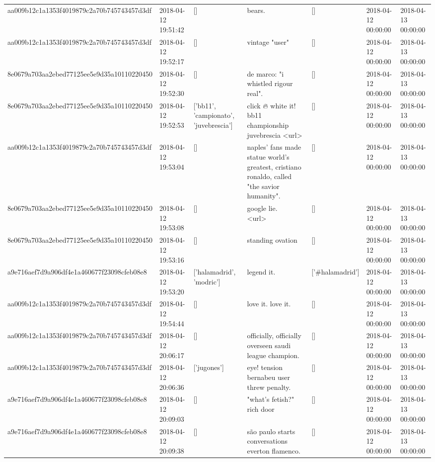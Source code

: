\begin{tabular}{lllllll}
aa009b12c1a1353f4019879c2a70b745743457d3df & 2018-04-12 19:51:42 & [] & bears. & [] & 2018-04-12 00:00:00 & 2018-04-13 00:00:00 \\
aa009b12c1a1353f4019879c2a70b745743457d3df & 2018-04-12 19:52:17 & [] & vintage "user" & [] & 2018-04-12 00:00:00 & 2018-04-13 00:00:00 \\
8e0679a703aa2ebed77125ee5e9d35a10110220450 & 2018-04-12 19:52:30 & [] & de marco: "i whistled rigour real". & [] & 2018-04-12 00:00:00 & 2018-04-13 00:00:00 \\
8e0679a703aa2ebed77125ee5e9d35a10110220450 & 2018-04-12 19:52:53 & ['bb11', 'campionato', 'juvebrescia'] & click 🔥 white it! bb11 championship juvebrescia <url> & [] & 2018-04-12 00:00:00 & 2018-04-13 00:00:00 \\
aa009b12c1a1353f4019879c2a70b745743457d3df & 2018-04-12 19:53:04 & [] & naples' fans made statue world's greatest, cristiano ronaldo, called "the savior humanity". & [] & 2018-04-12 00:00:00 & 2018-04-13 00:00:00 \\
8e0679a703aa2ebed77125ee5e9d35a10110220450 & 2018-04-12 19:53:08 & [] & google lie. 🔴🔴🔴 <url> & [] & 2018-04-12 00:00:00 & 2018-04-13 00:00:00 \\
8e0679a703aa2ebed77125ee5e9d35a10110220450 & 2018-04-12 19:53:16 & [] & standing ovation 👏👏👏👏👏👏 & [] & 2018-04-12 00:00:00 & 2018-04-13 00:00:00 \\
a9e716aef7d9a906df4e1a460677f23098cfeb08e8 & 2018-04-12 19:53:20 & ['halamadrid', 'modric'] & legend it. & ['#halamadrid'] & 2018-04-12 00:00:00 & 2018-04-13 00:00:00 \\
aa009b12c1a1353f4019879c2a70b745743457d3df & 2018-04-12 19:54:44 & [] & love it. love it. & [] & 2018-04-12 00:00:00 & 2018-04-13 00:00:00 \\
aa009b12c1a1353f4019879c2a70b745743457d3df & 2018-04-12 20:06:17 & [] & officially, officially overseen saudi league champion. & [] & 2018-04-12 00:00:00 & 2018-04-13 00:00:00 \\
aa009b12c1a1353f4019879c2a70b745743457d3df & 2018-04-12 20:06:36 & ['jugones'] & eye! tension bernabeu user threw penalty. & [] & 2018-04-12 00:00:00 & 2018-04-13 00:00:00 \\
a9e716aef7d9a906df4e1a460677f23098cfeb08e8 & 2018-04-12 20:09:03 & [] & "what's fetish?" rich door & [] & 2018-04-12 00:00:00 & 2018-04-13 00:00:00 \\
a9e716aef7d9a906df4e1a460677f23098cfeb08e8 & 2018-04-12 20:09:38 & [] & são paulo starts conversations everton flamenco. & [] & 2018-04-12 00:00:00 & 2018-04-13 00:00:00 \\

\end{tabular}
